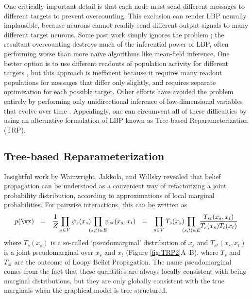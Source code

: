 \documentclass{article}
\begin{document}
One critically important detail is that each node must send different messages to different targets to prevent overcounting. This exclusion can render LBP neurally implausible, because neurons cannot readily send different output signals to many different target neurons. Some past work simply ignores the problem \cite{ott2006neurodynamics,litvak2009cortical}; the resultant overcounting destroys much of the inferential power of LBP, often performing worse than more na{\"i}ve algorithms like mean-field inference. %
One better option is to use different readouts of population activity for different targets \cite{steimer2009belief}, but this approach is inefficient because it requires many readout populations for messages that differ only slightly, and requires separate optimization for each possible target. Other efforts have avoided the problem entirely by performing only unidirectional inference of low-dimensional variables that evolve over time \cite{rao2004hierarchical}. Appealingly, one can circumvent all of these difficulties by using an alternative formulation of LBP known as Tree-based Reparameterization (TRP).



\subsection{Tree-based Reparameterization}


Insightful work by Wainwright, Jakkola, and Willsky \cite{wainwright2003tree} revealed that belief propagation can be understood as a convenient way of refactorizing a joint probability distribution, according to approximations of local marginal probabilities. For pairwise interactions, this can be written as
\begin{equation}
p(\vx) \ \ = \ \ \frac{1}{Z}\prod_{s\in V} \psi_s(x_s)\!\!\!\prod_{(s,t)\in E} \!\!\!\psi_{st}(x_s,x_t)
\ \ =\ \ \prod_{s\in V}T_s(x_s)\!\!\! \prod_{(s,t) \in E}\!\! \frac{T_{st}(x_s,x_t)}{T_s(x_s)T_t(x_t)}
\label{TRPEqn}
\end{equation}
where $T_s(x_s)$ is a so-called `pseudomarginal' distribution of $x_s$ and $T_{st}(x_s,x_t)$ is a joint pseudomarginal over $x_s$ and $x_t$ (Figure \ref{fig:TRP2}A--B), where $T_s$ and $T_{st}$ are the outcome of Loopy Belief Propagation. The name pseudomarginal comes from the fact that these quantities are always locally consistent with being marginal distributions, but they are only globally consistent with the true marginals when the graphical model is tree-structured.
\end{document}
